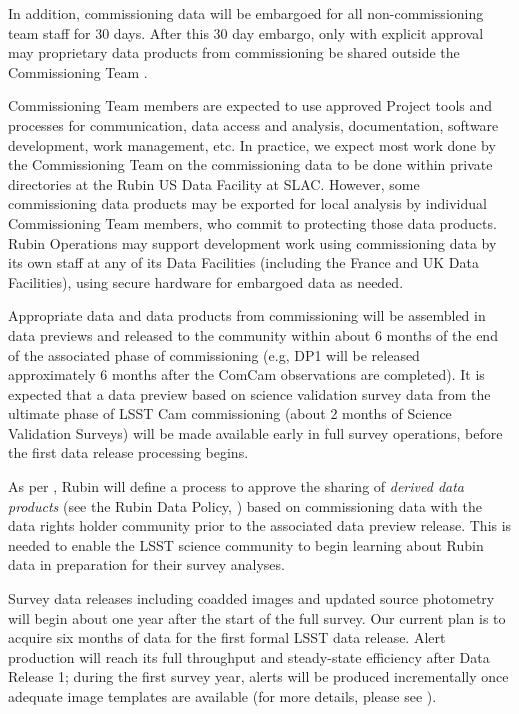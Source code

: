 In addition, commissioning data will be embargoed for all non-commissioning team staff for 30 days. 
After this 30 day embargo, only with explicit approval may proprietary data products from commissioning be shared outside the Commissioning Team   . 

Commissioning Team members are expected to use approved Project tools and processes for communication, data access and analysis, documentation, software development, work management, etc.
In practice, we expect most work done by the Commissioning Team on the commissioning data to be done within private directories at the Rubin US Data Facility at SLAC. 
However, some commissioning data products may be exported for local analysis by individual Commissioning Team members, who commit to protecting those data products. 
Rubin Operations may support development work using commissioning data by its own staff at any of its Data Facilities (including the France and UK Data Facilities), using secure hardware for embargoed data as needed.

Appropriate data and data products from commissioning will be assembled in data previews  and released to the community within about 6 months of the end of the associated phase of commissioning (e.g, DP1 will be released approximately 6 months after the ComCam observations are completed).
It is expected that a data preview based on science validation survey data from the ultimate phase of LSST Cam commissioning (about 2 months of Science Validation Surveys) will be made available early in full survey operations, before the first data release processing begins.

As per , Rubin will define a process to approve the sharing of {\it derived data products} (see the Rubin Data Policy, ) based on commissioning data with the data rights holder community prior to the associated data preview release.
This is needed to enable the LSST science community to begin learning about Rubin data in preparation for their survey analyses. 

Survey data releases including coadded images and updated source photometry will begin about one year after the start of the full survey. 
Our current plan is to acquire six months of data for the first formal LSST data release.
Alert production will reach its full throughput and steady-state efficiency after Data Release 1; during the first survey year, alerts will be produced incrementally once adequate image templates are available (for more details, please see ). 
